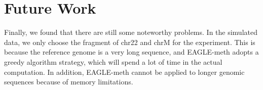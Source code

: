 \documentclass{PHlab-thesis}
\begin{document}
\section{Future Work}
Finally, we found that there are still some noteworthy problems. In the simulated data, we only choose the fragment of chr22 and chrM for the experiment. This is because the reference genome is a very long sequence, and EAGLE-meth adopts a greedy algorithm strategy, which will spend a lot of time in the actual computation. In addition, EAGLE-meth cannot be applied to longer genomic sequences because of memory limitations.





\newpage
{}
\printbibliography
\end{document}
